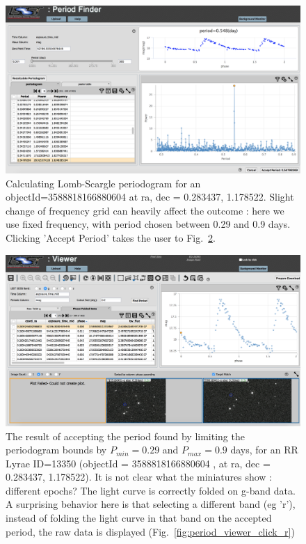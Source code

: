 \documentclass[DM,lsstdraft,toc,usenatbib]{lsstdoc}
\begin{document}
\begin{figure}
\includegraphics[width=\textwidth]{figs/Period_finder_fix_freq_029-09_best}
\caption{Calculating Lomb-Scargle periodogram for an objectId=3588818166880604 at  ra, dec = 0.283437\degree, 1.178522\degree. Slight change of frequency grid can heavily affect the outcome  : here we use fixed frequency, with period chosen between 0.29 and 0.9 days. 
Clicking 'Accept Period' takes the user to Fig.~\ref{fig:period_viewer_accept_period}.}
\label{fig:period_finder_best_bounds}
\end{figure}




\begin{figure}
\includegraphics[width=\textwidth]{figs/Period_viewer_fix_freq_029-09_best}
\caption{The result of accepting the period found by limiting the periodogram bounds by $P_{min} =  0.29 $ and $P_{max} = 0.9$ days, for an RR Lyrae ID=13350 (objectId = 3588818166880604 , at  ra, dec = 0.283437\degree, 1.178522\degree). It is not clear what the miniatures show : different epochs?  The light curve is correctly folded on g-band data. A surprising behavior here is that selecting a different band (eg 'r'), instead of folding the light curve in that band  on the accepted period, the raw data is displayed (Fig.~\ref{fig:period_viewer_click_r})  }
\label{fig:period_viewer_accept_period}
\end{figure}
\end{document}
